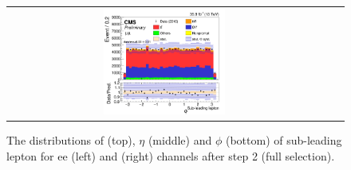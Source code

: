 \begin{figure}[ht]
\begin{center}
\begin{tabular}{ccc}
      \includegraphics[width=0.4\textwidth]{figures/tW/fig/Step2/mumu/H_lepton_sub_phi.png}\\
    \end{tabular}
    \caption{The distributions of \pt (top), $\eta$ (middle) and $\phi$ (bottom) of sub-leading lepton for ee (left) and \mumu (right) channels after step 2 (full selection).
    \label{fig:step2_subleading_lepton}}
  \end{center}
\end{figure}


